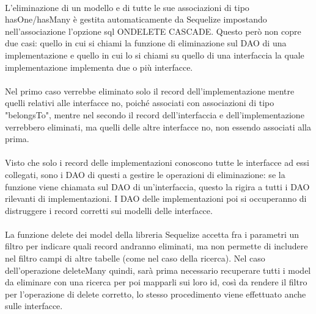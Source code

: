 \documentclass[a4paper, 12pt]{report}
\begin{document}
      \paragraph*{}
      L'eliminazione di un modello e di tutte le sue associazioni di tipo hasOne/hasMany è gestita automaticamente da Sequelize impostando nell'associazione l'opzione sql ONDELETE CASCADE.
      Questo però non copre due casi: quello in cui si chiami la funzione di eliminazione sul DAO di una implementazione e quello in cui lo si chiami su quello di una interfaccia la quale implementazione implementa due o più interfacce.
      \paragraph*{}
      Nel primo caso verrebbe eliminato solo il record dell'implementazione mentre quelli relativi alle interfacce no, poiché associati con associazioni di tipo "belongsTo", mentre nel secondo il record dell'interfaccia e dell'implementazione verrebbero eliminati, ma quelli delle altre interfacce no, non essendo associati alla prima.
      \paragraph*{}
      Visto che solo i record delle implementazioni conoscono tutte le interfacce ad essi collegati, sono i DAO di questi a gestire le operazioni di eliminazione: se la funzione viene chiamata sul DAO di un'interfaccia, questo la rigira a tutti i DAO rilevanti di implementazioni.
      I DAO delle implementazioni poi si occuperanno di distruggere i record corretti sui modelli delle interfacce.
      \paragraph*{}
      La funzione delete dei model della libreria Sequelize accetta fra i parametri un filtro per indicare quali record andranno eliminati, ma non permette di includere nel filtro campi di altre tabelle (come nel caso della ricerca).
      Nel caso dell'operazione deleteMany quindi, sarà prima necessario recuperare tutti i model da eliminare con una ricerca per poi mapparli sui loro id, così da rendere il filtro per l'operazione di delete corretto, lo stesso procedimento viene effettuato anche sulle interfacce.
    \newpage
\end{document}
